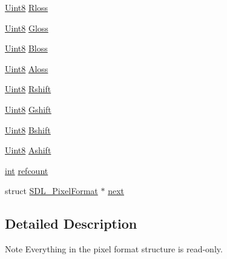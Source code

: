 \begin{DoxyCompactItemize}
\item 
\hyperlink{_s_d_l__stdinc_8h_a2944638813a090aa23e62f4da842c3e2}{Uint8} \hyperlink{struct_s_d_l___pixel_format_a9994b4ed87a2551253aebfa191db8424}{Rloss}
\item 
\hyperlink{_s_d_l__stdinc_8h_a2944638813a090aa23e62f4da842c3e2}{Uint8} \hyperlink{struct_s_d_l___pixel_format_a94469768d8436e631a13d68623ff663f}{Gloss}
\item 
\hyperlink{_s_d_l__stdinc_8h_a2944638813a090aa23e62f4da842c3e2}{Uint8} \hyperlink{struct_s_d_l___pixel_format_a337072c1bc8b41efdd2da4e95b8c2ff7}{Bloss}
\item 
\hyperlink{_s_d_l__stdinc_8h_a2944638813a090aa23e62f4da842c3e2}{Uint8} \hyperlink{struct_s_d_l___pixel_format_a660e95097874088292f1289a458efaa2}{Aloss}
\item 
\hyperlink{_s_d_l__stdinc_8h_a2944638813a090aa23e62f4da842c3e2}{Uint8} \hyperlink{struct_s_d_l___pixel_format_abfdec7b9ee2ee39db630f4022e4e0daa}{Rshift}
\item 
\hyperlink{_s_d_l__stdinc_8h_a2944638813a090aa23e62f4da842c3e2}{Uint8} \hyperlink{struct_s_d_l___pixel_format_a6045012f994c02a86bdc4a91b28d2a3c}{Gshift}
\item 
\hyperlink{_s_d_l__stdinc_8h_a2944638813a090aa23e62f4da842c3e2}{Uint8} \hyperlink{struct_s_d_l___pixel_format_a4212574b67529628d8822ed4eb109754}{Bshift}
\item 
\hyperlink{_s_d_l__stdinc_8h_a2944638813a090aa23e62f4da842c3e2}{Uint8} \hyperlink{struct_s_d_l___pixel_format_ac3c4ffa0de1f2c94040340deede3bf46}{Ashift}
\item 
\hyperlink{_s_d_l__thread_8h_a6a64f9be4433e4de6e2f2f548cf3c08e}{int} \hyperlink{struct_s_d_l___pixel_format_a23be8060443d58064a720a4e2ef31729}{refcount}
\item 
struct \hyperlink{struct_s_d_l___pixel_format}{S\-D\-L\-\_\-\-Pixel\-Format} $\ast$ \hyperlink{struct_s_d_l___pixel_format_a1953b66c817116bf81bae4873ee6bce5}{next}
\end{DoxyCompactItemize}


\subsection{Detailed Description}
\begin{DoxyNote}{Note}
Everything in the pixel format structure is read-\/only. 
\end{DoxyNote}


